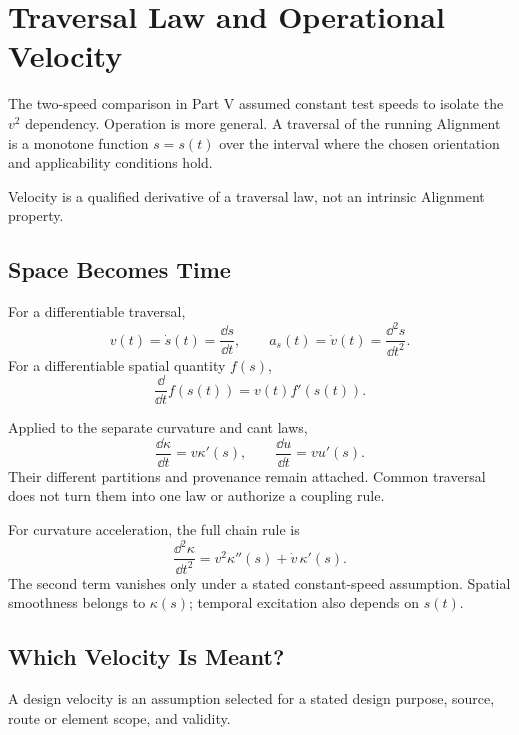 \chapter{Traversal Law and Operational Velocity}
\label{chap:operational-velocity}

The two-speed comparison in Part V assumed constant test speeds to isolate the
\(v^2\) dependency. Operation is more general. A traversal of the running
Alignment is a monotone function \(s=s(t)\) over the interval where the chosen
orientation and applicability conditions hold.

\begin{principle}
\label{princ:velocity-runtime}
Velocity is a qualified derivative of a traversal law, not an intrinsic
Alignment property.
\end{principle}

\section{Space Becomes Time}

\begin{definition}
\label{def:velocity-relation}
For a differentiable traversal,
\[
v(t)=\dot s(t)=\frac{\dd s}{\dd t},
\qquad
a_s(t)=\dot v(t)=\frac{\dd^2s}{\dd t^2}.
\]
For a differentiable spatial quantity \(f(s)\),
\[
\frac{\dd}{\dd t}f(s(t))=v(t)f'(s(t)).
\]
\end{definition}

Applied to the separate curvature and cant laws,
\[
\frac{\dd\kappa}{\dd t}=v\kappa'(s),
\qquad
\frac{\dd u}{\dd t}=v u'(s).
\]
Their different partitions and provenance remain attached. Common traversal
does not turn them into one law or authorize a coupling rule.

For curvature acceleration, the full chain rule is
\begin{equation}
\frac{\dd^2\kappa}{\dd t^2}
=v^2\kappa''(s)+\dot v\,\kappa'(s).
\label{eq:curvature-second-time-derivative}
\end{equation}
The second term vanishes only under a stated constant-speed assumption.
Spatial smoothness belongs to \(\kappa(s)\); temporal excitation also depends
on \(s(t)\).

\section{Which Velocity Is Meant?}

\begin{definition}
\label{def:design-velocity}
A design velocity is an assumption selected for a stated design purpose,
source, route or element scope, and validity.
\end{definition}


